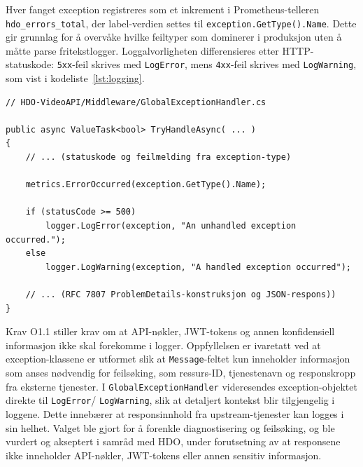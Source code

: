 
Hver fanget exception registreres som et inkrement i
Prometheus-telleren \texttt{hdo\_errors\_total}, der label-verdien
settes til \texttt{exception.GetType().Name}. Dette gir grunnlag for
å overvåke hvilke feiltyper som dominerer i produksjon uten å måtte
parse fritekstlogger. Loggalvorligheten differensieres etter
HTTP-statuskode: \texttt{5xx}-feil skrives med \texttt{LogError},
mens \texttt{4xx}-feil skrives med \texttt{LogWarning}, som vist i kodeliste~\ref{lst:logging}.

\begin{lstlisting}[language={[Sharp]C}, caption={Differensiert logging i \texttt{GlobalExceptionHandler}.}, label={lst:logging}]
// HDO-VideoAPI/Middleware/GlobalExceptionHandler.cs

public async ValueTask<bool> TryHandleAsync( ... )
{
    // ... (statuskode og feilmelding fra exception-type)
    
    metrics.ErrorOccurred(exception.GetType().Name);
    
    if (statusCode >= 500)
        logger.LogError(exception, "An unhandled exception occurred.");
    else
        logger.LogWarning(exception, "A handled exception occurred");

    // ... (RFC 7807 ProblemDetails-konstruksjon og JSON-respons))
}
\end{lstlisting}


Krav O1.1 \cite{hdo_kravspec} stiller krav om at API-nøkler, JWT-tokens og annen konfidensiell informasjon ikke skal forekomme i logger. Oppfyllelsen er ivaretatt ved at exception-klassene er utformet slik at \texttt{Message}-feltet kun inneholder informasjon som anses nødvendig for feilsøking, som ressurs-ID, tjenestenavn og responskropp fra eksterne tjenester. I \texttt{GlobalExceptionHandler} videresendes exception-objektet direkte til \texttt{LogError}/ \texttt{LogWarning}, slik at detaljert kontekst blir tilgjengelig i loggene. Dette innebærer at responsinnhold fra upstream-tjenester kan logges i sin helhet. Valget ble gjort for å forenkle diagnostisering og feilsøking, og ble vurdert og akseptert i samråd med HDO, under forutsetning av at responsene ikke inneholder API-nøkler, JWT-tokens eller annen sensitiv informasjon.


